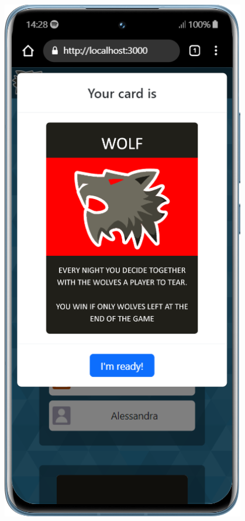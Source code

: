 \begin{figure}[H]
    \centering
    \begin{minipage}{0.25\textwidth}
        \centering
        \includegraphics[width=0.95\textwidth]{img/screen/mobile/card_mobile.png}

\end{minipage}
\end{figure}
